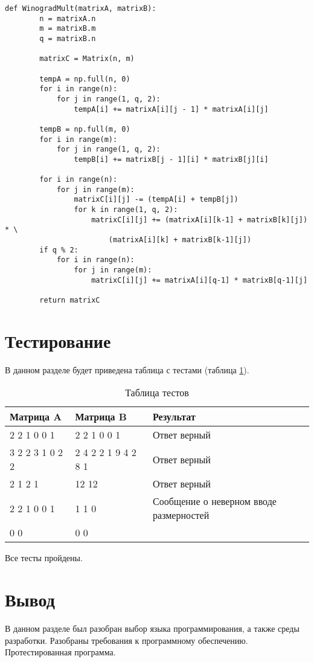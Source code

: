 \begin{lstlisting}[label=some-code,caption=Алгоритм Винограда]
    def WinogradMult(matrixA, matrixB):
        n = matrixA.n
        m = matrixB.m
        q = matrixB.n

        matrixC = Matrix(n, m)

        tempA = np.full(n, 0)
        for i in range(n):
            for j in range(1, q, 2):
                tempA[i] += matrixA[i][j - 1] * matrixA[i][j]

        tempB = np.full(m, 0)
        for i in range(m):
            for j in range(1, q, 2):
                tempB[i] += matrixB[j - 1][i] * matrixB[j][i]

        for i in range(n):
            for j in range(m):
                matrixC[i][j] -= (tempA[i] + tempB[j])
                for k in range(1, q, 2):
                    matrixC[i][j] += (matrixA[i][k-1] + matrixB[k][j]) * \
                        (matrixA[i][k] + matrixB[k-1][j])
        if q % 2:
            for i in range(n):
                for j in range(m):
                    matrixC[i][j] += matrixA[i][q-1] * matrixB[q-1][j]

        return matrixC
\end{lstlisting}

\section{Тестирование}

В данном разделе будет приведена таблица с тестами (таблица \ref{table:ref1}).

\begin{table}[ht]
    \centering
    \caption{Таблица тестов}
    \label{table:ref1}
    \begin{tabular}{ | l | l | l |}
        \hline
        Матрица A       & Матрица B           & Результат                               \\ \hline
        2 2 1 0 0 1     & 2 2 1 0 0 1         & Ответ верный                            \\ \hline
        3 2 2 3 1 0 2 2 & 2 4 2 2 1 9 4 2 8 1 & Ответ верный                            \\ \hline
        2 1 2 1         & 12 12               & Ответ верный                            \\ \hline
        2 2 1 0 0 1     & 1 1 0               & Сообщение о неверном вводе размерностей \\ \hline
        0 0             & 0 0                 &                                         \\ \hline
        \hline
    \end{tabular}
\end{table}

Все тесты пройдены.

\section{Вывод}

В данном разделе был разобран выбор языка программирования, а также среды разработки.
Разобраны требования к программному обеспечению.
Протестированная программа. 
